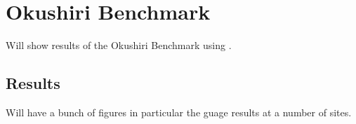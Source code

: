 
\section{Okushiri Benchmark}

Will show results of the Okushiri Benchmark using \anuga{}.

\subsection{Results}


Will have a bunch of figures in particular the guage results at a number of sites. 




\endinput